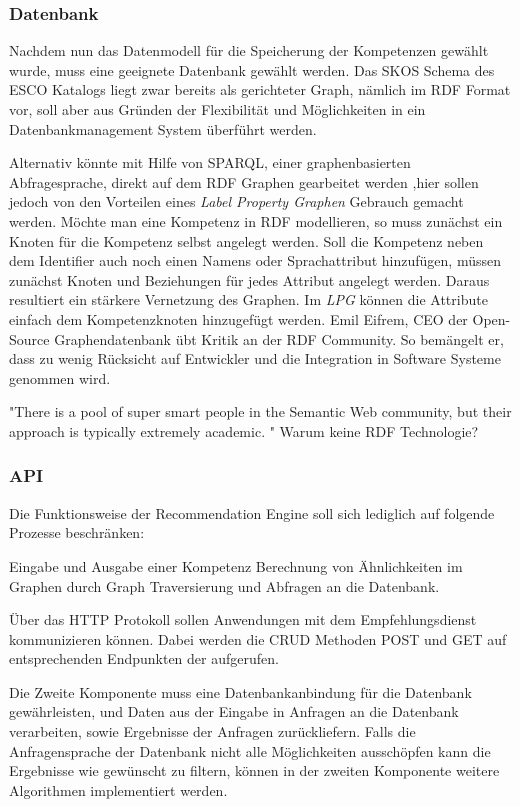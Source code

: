 \subsubsection{Datenbank}

Nachdem nun das Datenmodell für die Speicherung der Kompetenzen gewählt wurde, muss eine geeignete Datenbank gewählt werden. Das SKOS Schema des ESCO Katalogs liegt zwar bereits als gerichteter Graph, nämlich im RDF Format vor, soll aber aus Gründen der Flexibilität und Möglichkeiten in ein Datenbankmanagement System überführt werden.

Alternativ könnte mit Hilfe von SPARQL, einer graphenbasierten Abfragesprache, direkt auf dem RDF Graphen gearbeitet werden 
,hier sollen jedoch von den Vorteilen eines \textit{Label Property Graphen}  Gebrauch gemacht werden. Möchte man eine Kompetenz in RDF modellieren, so muss zunächst ein Knoten für die Kompetenz selbst angelegt werden. Soll die Kompetenz neben dem Identifier auch noch einen Namens oder Sprachattribut hinzufügen, müssen zunächst Knoten und Beziehungen für jedes Attribut angelegt werden. Daraus resultiert ein stärkere Vernetzung des Graphen. Im \textit{LPG} können die Attribute einfach dem Kompetenzknoten hinzugefügt werden. Emil Eifrem, CEO der Open-Source Graphendatenbank \cite{Neo4j} übt Kritik an der RDF Community. So bemängelt er, dass zu wenig Rücksicht auf Entwickler und die Integration in Software Systeme genommen wird. \cite{anadiotis_2017} 

"There is a pool of super smart people in the Semantic Web community, but their approach is typically extremely academic. "
Warum keine RDF Technologie?
\subsubsection{API}

 Die Funktionsweise der Recommendation Engine soll sich lediglich auf folgende Prozesse beschränken:
 
 Eingabe und Ausgabe einer Kompetenz
Berechnung von Ähnlichkeiten im Graphen durch Graph Traversierung und Abfragen an die Datenbank.

Über das HTTP Protokoll sollen Anwendungen mit dem Empfehlungsdienst kommunizieren können. Dabei werden die CRUD Methoden POST und GET auf entsprechenden Endpunkten der aufgerufen. 

Die Zweite Komponente muss eine Datenbankanbindung für die Datenbank gewährleisten, und Daten aus der Eingabe in Anfragen an die Datenbank verarbeiten, sowie Ergebnisse der Anfragen zurückliefern. Falls die Anfragensprache der Datenbank nicht alle Möglichkeiten ausschöpfen kann die Ergebnisse wie gewünscht zu filtern, können in der zweiten Komponente weitere Algorithmen implementiert werden.

